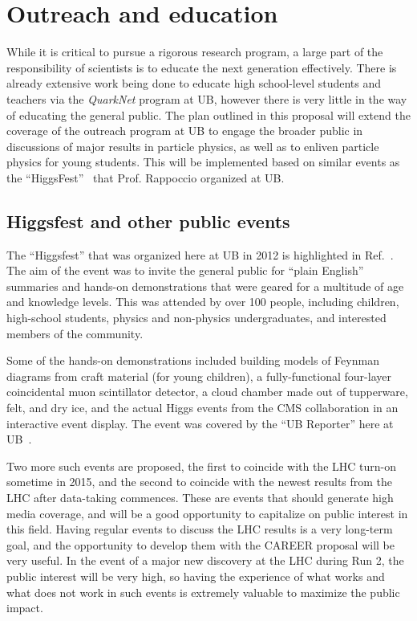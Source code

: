 \documentclass[12pt]{proposalnsf}
\begin{document}
\section{Outreach and education}
\label{sec:outreach}


While it is critical to pursue a rigorous research program, a large
part of the responsibility of scientists is to educate the next
generation effectively. There is already extensive work being done to
educate high school-level students and teachers via the {\em QuarkNet}
program  at UB, however there is
very little in the way of educating the general
public. 
The plan outlined in this proposal will extend the coverage of the
outreach program at UB to engage the broader
public in discussions of major results in particle
physics, as well as to enliven particle physics for young students. 
This will be implemented based on similar events as the
``HiggsFest''~\cite{higgsfest} that Prof. Rappoccio organized at UB. 


\subsection{Higgsfest and other public events}

The ``Higgsfest'' that was organized here at UB in 2012
is highlighted in Ref.~\cite{higgsfest}. The aim of the event was to
invite the general public for ``plain English'' summaries and hands-on
demonstrations that were geared for a multitude of age and knowledge
levels. 
This was attended by over 100 people, including children,
high-school students, physics and non-physics undergraduates, and
interested members of the community. 

Some of the hands-on demonstrations included building models of
Feynman diagrams from craft material (for young children), a
fully-functional four-layer coincidental muon scintillator detector,
a cloud chamber made out of tupperware, felt, and dry ice, and the
actual Higgs events from the CMS collaboration in an interactive event
display. 
The event was covered by the ``UB Reporter'' here at
UB~\cite{higgsfest_ubreporter}. 

Two more such events are proposed, the first to coincide with the LHC
turn-on sometime in 2015, and the second to coincide with the newest
results from the LHC after data-taking commences. These are 
events that should generate high media coverage, and will be a good
opportunity to capitalize on public interest in this field. Having
regular events to discuss the LHC results is a very long-term goal,
and the opportunity to develop them with the CAREER proposal
will be very useful. In the event of a major new discovery at the LHC
during Run 2, the public interest will be very high, so having the
experience of what works and what does not work in such events is
extremely valuable to maximize the public impact. 
\end{document}
